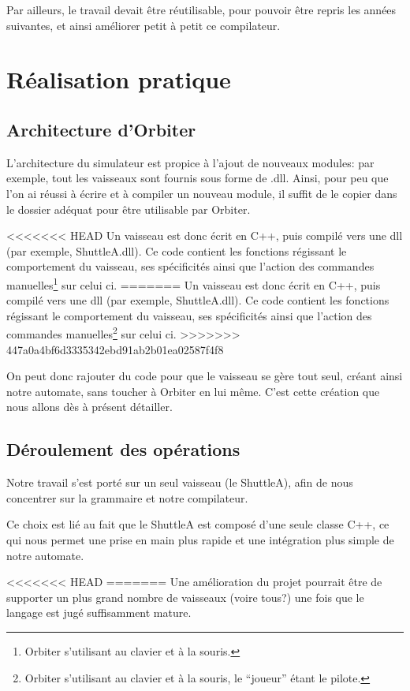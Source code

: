 \documentclass[a4paper,11pt]{article}
\begin{document}
        Par ailleurs, le travail devait être réutilisable, pour pouvoir être repris les années suivantes, et ainsi améliorer petit à petit ce compilateur.

\section{Réalisation pratique}
    \subsection{Architecture d'Orbiter}
        L'architecture du simulateur est propice à l'ajout de nouveaux modules: par exemple, tout les vaisseaux sont fournis sous forme de .dll. Ainsi, pour peu que l'on ai réussi à écrire et à compiler un nouveau module, il suffit de le copier dans le dossier adéquat pour être utilisable par Orbiter.
        
<<<<<<< HEAD
        Un vaisseau est donc écrit en C++, puis compilé vers une dll (par exemple, ShuttleA.dll). Ce code contient les fonctions régissant le comportement du vaisseau, ses spécificités ainsi que l'action des commandes manuelles\footnote{Orbiter s'utilisant au clavier et à la souris.} sur celui ci.
=======
        Un vaisseau est donc écrit en C++, puis compilé vers une dll (par exemple, ShuttleA.dll). Ce code contient les fonctions régissant le comportement du vaisseau, ses spécificités ainsi que l'action des commandes manuelles\footnote{Orbiter s'utilisant au clavier et à la souris, le "`joueur"' étant le pilote.} sur celui ci.
>>>>>>> 447a0a4bf6d3335342ebd91ab2b01ea02587f4f8
        
        On peut donc rajouter du code pour que le vaisseau se gère tout seul, créant ainsi notre automate, sans toucher à Orbiter en lui même. C'est cette création que nous allons dès à présent détailler.

    \subsection{Déroulement des opérations}
        Notre travail s'est porté sur un seul vaisseau (le ShuttleA), afin de nous concentrer sur la grammaire et notre compilateur. 
        
        Ce choix est lié au fait que le ShuttleA est composé d'une seule classe C++, ce qui nous permet une prise en main plus rapide et une intégration plus simple de notre automate. 
        
<<<<<<< HEAD
=======
        Une amélioration du projet pourrait être de supporter un plus grand nombre de vaisseaux (voire tous?) une fois que le langage est jugé suffisamment mature.
\end{document}
